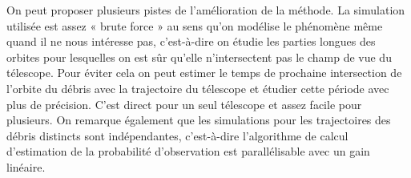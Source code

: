 On peut proposer plusieurs pistes de l'am\'elioration de la m\'ethode. 
La simulation utilis\'ee est assez « brute force » au sens qu'on mod\'elise le ph\'enom\`ene m\^eme quand il
 ne nous int\'eresse pas, c'est-\`a-dire on \'etudie les parties longues des orbites pour lesquelles on est sûr 
qu'elle n'intersectent pas le champ de vue du t\'elescope. Pour \'eviter cela on peut estimer le temps de prochaine
intersection de l'orbite du d\'ebris avec la trajectoire du t\'elescope et \'etudier cette p\'eriode avec plus de pr\'ecision. 
C'est direct pour un seul t\'elescope et assez facile pour plusieurs. On remarque \'egalement que les simulations
pour les trajectoires des d\'ebris distincts sont ind\'ependantes, c'est-\`a-dire l'algorithme de calcul d'estimation de la
probabilit\'e d'observation est parall\'elisable avec un gain lin\'eaire. 
   
   
